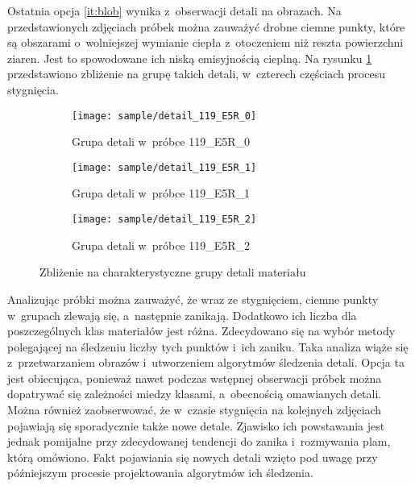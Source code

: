 Ostatnia opcja \ref{it:blob} wynika z~obserwacji detali na obrazach.
Na przedstawionych zdjęciach próbek można zauważyć drobne ciemne punkty,
które są obszarami o~wolniejszej wymianie ciepła z~otoczeniem niż reszta
powierzchni ziaren.
Jest to spowodowane ich niską emisyjnością cieplną.
Na rysunku \ref{fig:blobdetail} przedstawiono zbliżenie na grupę takich
detali, w~czterech częściach procesu stygnięcia.
\begin{figure}[htb]
	\centering
	\begin{subfigure}{0.3\textwidth}
		\centering
		\texttt{[image: sample/detail\_119\_E5R\_0]}
		\caption{Grupa detali w~próbce 119\_E5R\_0}
	\end{subfigure}
	\hspace{0.25cm}
	\centering
	\begin{subfigure}{0.3\textwidth}
		\centering
		\texttt{[image: sample/detail\_119\_E5R\_1]}
		\caption{Grupa detali w~próbce 119\_E5R\_1}
	\end{subfigure}
	\hspace{0.24cm}
	\begin{subfigure}{0.3\textwidth}
		\centering
		\texttt{[image: sample/detail\_119\_E5R\_2]}
		\caption{Grupa detali w~próbce 119\_E5R\_2}
	\end{subfigure}
	\caption{Zbliżenie na charakterystyczne grupy detali materiału}
	\label{fig:blobdetail}
\end{figure}

Analizując próbki można zauważyć, że wraz ze stygnięciem, ciemne punkty
w~grupach zlewają się, a~następnie zanikają.
Dodatkowo ich liczba dla poszczególnych klas materiałów jest różna.
Zdecydowano się na wybór metody polegającej na śledzeniu liczby tych punktów
i~ich zaniku.
Taka analiza wiąże się z~przetwarzaniem obrazów i~utworzeniem algorytmów
śledzenia detali.
Opcja ta jest obiecująca, ponieważ nawet podczas wstępnej obserwacji próbek
można dopatrywać się zależności miedzy klasami, a~obecnością omawianych
detali.
Można również zaobserwować, że w~czasie stygnięcia na kolejnych zdjęciach
pojawiają się sporadycznie także nowe detale.
Zjawisko ich powstawania jest jednak pomijalne przy zdecydowanej tendencji
do zanika i~rozmywania plam, którą omówiono.
Fakt pojawiania się nowych detali wzięto pod uwagę przy późniejszym procesie
projektowania algorytmów ich śledzenia.

